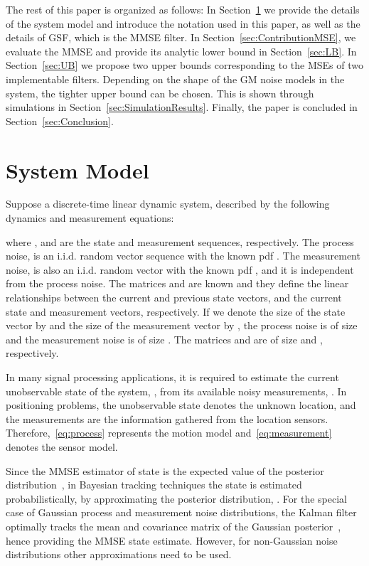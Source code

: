 \documentclass[10pt,twocolumn,twoside]{IEEEtran}
\newcommand{\corcol}[1]{\textcolor{CorCol}{#1}}
\begin{document}
The rest of this paper is organized as follows: In Section~\ref{sec:Notations} we provide the details of the system model and introduce the notation used in this paper, as well as the details of GSF, which is the MMSE filter. In Section~\ref{sec:ContributionMSE}, we evaluate the MMSE and provide its analytic lower bound in Section~\ref{sec:LB}. In Section~\ref{sec:UB} we propose two upper bounds corresponding to the MSEs of two implementable filters. Depending on the shape of the GM noise models in the system, the tighter upper bound can be chosen. This is shown through simulations in Section~\ref{sec:SimulationResults}. Finally, the paper is concluded in Section~\ref{sec:Conclusion}. 

\section{System Model}
\label{sec:Notations}
Suppose a discrete-time linear dynamic system, described by the following dynamics and measurement equations:

where , and  are the state and measurement sequences, respectively. The process noise,  is an i.i.d. random vector sequence with the known pdf .   The measurement noise,  is also an i.i.d. random vector with the known pdf , and it is independent from the process noise. The matrices  and  are known and they define the linear relationships between the current and previous state vectors, and the current state and measurement vectors, respectively. \corcol{If we denote the size of the state vector by  and the size of the measurement vector by , the process noise is of size  and the measurement noise is of size . The matrices  and  are of size  and , respectively.}

In many signal processing applications, it is required to estimate the current unobservable state of the system, , from its available noisy measurements, . In positioning problems, the unobservable state denotes the unknown location, and the measurements are the information gathered from the location sensors. Therefore,~\eqref{eq:process} represents the motion model and~\eqref{eq:measurement} denotes the sensor model.

Since the MMSE estimator of state is the expected value of the posterior distribution~\cite{bar2001estimation,poor_introduction_1994}, in Bayesian tracking techniques the state is estimated probabilistically, by approximating the posterior distribution, . For the special case of Gaussian process and measurement noise distributions, \corcol{the} Kalman filter optimally tracks the mean and covariance matrix of the Gaussian posterior~\cite{ho_bayesian_1964}, hence providing the MMSE state estimate. However, for non-Gaussian noise distributions other approximations need to be used. 
\end{document}
